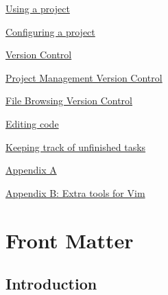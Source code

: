 \documentclass[10pt,a4paper,english]{article}
\begin{document}
\begin{list}{}{}
\begin{list}{}{}
\begin{list}{}{}
\item {} \href{\#using-a-project}{Using a project}

\item {} \href{\#configuring-a-project}{Configuring a project}

\end{list}

\item {} \href{\#version-control}{Version Control}
\begin{list}{}{}
\item {} \href{\#project-management-version-control}{Project Management Version Control}

\item {} \href{\#file-browsing-version-control}{File Browsing Version Control}

\end{list}

\item {} \href{\#editing-code}{Editing code}
\begin{list}{}{}
\item {} \href{\#keeping-track-of-unfinished-tasks}{Keeping track of unfinished tasks}

\end{list}

\end{list}

\item {} \href{\#appendix-a}{Appendix A}

\item {} \href{\#appendix-b-extra-tools-for-vim}{Appendix B: Extra tools for Vim}

\end{list}




\hypertarget{front-matter}{}
\section*{Front Matter}



\hypertarget{introduction}{}
\subsection*{Introduction}
\end{document}
